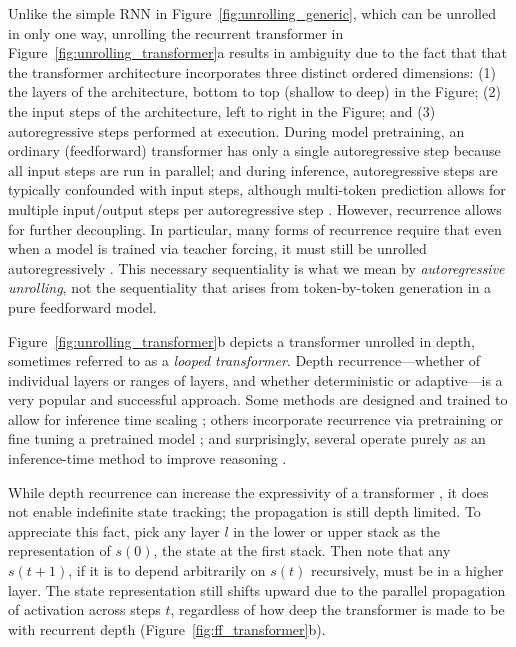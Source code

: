 \documentclass{article}
\begin{document}
Unlike the simple RNN in Figure~\ref{fig:unrolling_generic}, which can be unrolled 
in only one way, unrolling the recurrent transformer in 
Figure~\ref{fig:unrolling_transformer}a  results in ambiguity
due to the fact that that the transformer
architecture incorporates three distinct ordered dimensions:
(1) the layers of the architecture, bottom to top (shallow to deep) in the Figure;
(2) the input steps of the architecture, left to right in the Figure; and
(3) autoregressive steps performed at execution. During model pretraining,
an ordinary (feedforward) transformer has only a single autoregressive step 
because all input steps are run in parallel; and during inference, autoregressive
steps are typically confounded with input steps, although multi-token prediction
allows for multiple input/output steps per autoregressive step \citep{gloeckle2024better}.
However,
recurrence allows for further decoupling. In particular, many forms of
recurrence require that even when a model is trained via teacher forcing,
it must still be unrolled autoregressively \citep{teoh2025next}. This necessary sequentiality is
what we mean by \emph{autoregressive unrolling}, not
the sequentiality that arises from token-by-token generation in a pure feedforward model.

Figure~\ref{fig:unrolling_transformer}b depicts a transformer unrolled in
depth, sometimes referred to as a \emph{looped transformer}. 
Depth recurrence---whether
of individual layers or ranges of layers, and whether deterministic or adaptive---is 
a very popular and successful approach.
Some methods are designed and trained to allow for inference time scaling
\citep[e.g.,][]{yang2024,nowak2024,raposo2024,alabdulmohsin2025recursive,bae2025,chen2025,geiping2025,rodkin2025,yu2025backattn,zhu2025,zeng2026ponderlm,jeddi2026loopformer}; others incorporate recurrence via pretraining \citep{sanyal2026} or fine tuning a pretrained model \citep{koishekenov2025,mcleish2025}; and surprisingly, several operate purely as an
inference-time method to improve reasoning
\citep{li2025skiplayerloopit,chen2026,ng2026rys}.

While depth recurrence can increase the expressivity of a 
transformer \citep{saunshi2025}, it does not enable indefinite state tracking;
the propagation is still depth limited. To appreciate this fact, pick any layer $l$
in the lower or upper stack as the representation of $s(0)$, the state at the 
first stack. Then note that any $s(t+1)$, if it is to depend arbitrarily on 
$s(t)$ recursively, must be in a higher layer. The state representation still
shifts upward due to the parallel propagation of activation across steps $t$,
regardless of how deep the transformer is made to be with recurrent depth (Figure~\ref{fig:ff_transformer}b).
\end{document}
